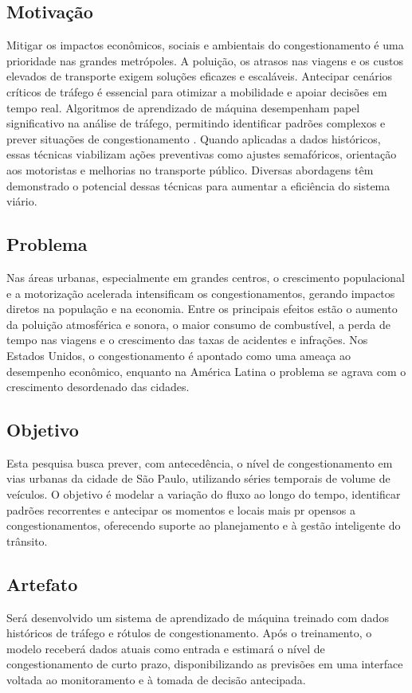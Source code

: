 \documentclass[conference]{IEEEtran}
\begin{document}
\subsection{Motivação}
Mitigar os impactos econômicos, sociais e ambientais do congestionamento é uma prioridade nas grandes metrópoles. A poluição, os atrasos nas viagens e os custos elevados de transporte exigem soluções eficazes e escaláveis. Antecipar cenários críticos de tráfego é essencial para otimizar a mobilidade e apoiar decisões em tempo real. Algoritmos de aprendizado de máquina desempenham papel significativo na análise de tráfego, permitindo identificar padrões complexos e prever situações de congestionamento \cite{2}. Quando aplicadas a dados históricos, essas técnicas viabilizam ações preventivas como ajustes semafóricos, orientação aos motoristas e melhorias no transporte público. Diversas abordagens têm demonstrado o potencial dessas técnicas para aumentar a eficiência do sistema viário.

\subsection{Problema}
Nas áreas urbanas, especialmente em grandes centros, o crescimento populacional e a motorização acelerada intensificam os congestionamentos, gerando impactos diretos na população e na economia. Entre os principais efeitos estão o aumento da poluição atmosférica e sonora, o maior consumo de combustível, a perda de tempo nas viagens e o crescimento das taxas de acidentes e infrações. Nos Estados Unidos, o congestionamento é apontado como uma ameaça ao desempenho econômico, enquanto na América Latina o problema se agrava com o crescimento desordenado das cidades.

\subsection{Objetivo}
Esta pesquisa busca prever, com antecedência, o nível de congestionamento em vias urbanas da cidade de São Paulo, utilizando séries temporais de volume de veículos. O objetivo é modelar a variação do fluxo ao longo do tempo, identificar padrões recorrentes e antecipar os momentos e locais mais pr   opensos a congestionamentos, oferecendo suporte ao planejamento e à gestão inteligente do trânsito.

\subsection{Artefato}
Será desenvolvido um sistema de aprendizado de máquina treinado com dados históricos de tráfego e rótulos de congestionamento. Após o treinamento, o modelo receberá dados atuais como entrada e estimará o nível de congestionamento de curto prazo, disponibilizando as previsões em uma interface voltada ao monitoramento e à tomada de decisão antecipada.
\end{document}
